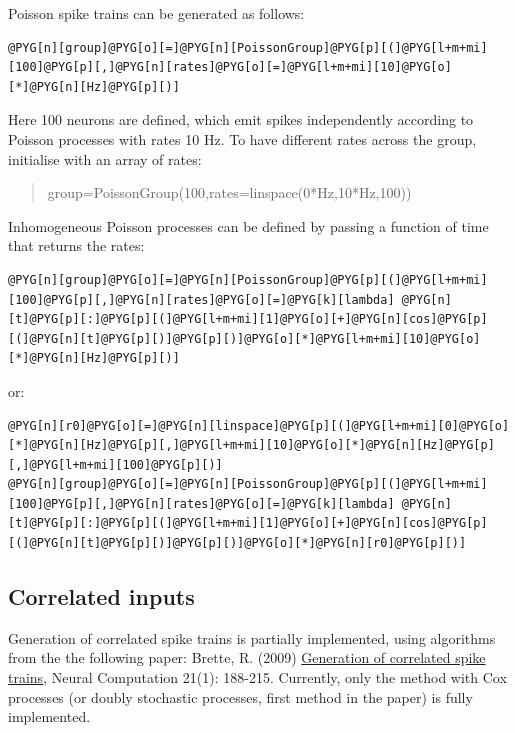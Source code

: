 \documentclass[letterpaper,10pt,english]{manual}
\begin{document}
Poisson spike trains can be generated as follows:

\begin{Verbatim}[commandchars=@\[\]]
@PYG[n][group]@PYG[o][=]@PYG[n][PoissonGroup]@PYG[p][(]@PYG[l+m+mi][100]@PYG[p][,]@PYG[n][rates]@PYG[o][=]@PYG[l+m+mi][10]@PYG[o][*]@PYG[n][Hz]@PYG[p][)]
\end{Verbatim}

Here 100 neurons are defined, which emit spikes independently according to Poisson
processes with rates 10 Hz. To have different rates across the group,
initialise with an array of rates:
\begin{quote}

group=PoissonGroup(100,rates=linspace(0*Hz,10*Hz,100))
\end{quote}

Inhomogeneous Poisson processes can be defined by passing a function of time that returns the
rates:

\begin{Verbatim}[commandchars=@\[\]]
@PYG[n][group]@PYG[o][=]@PYG[n][PoissonGroup]@PYG[p][(]@PYG[l+m+mi][100]@PYG[p][,]@PYG[n][rates]@PYG[o][=]@PYG[k][lambda] @PYG[n][t]@PYG[p][:]@PYG[p][(]@PYG[l+m+mi][1]@PYG[o][+]@PYG[n][cos]@PYG[p][(]@PYG[n][t]@PYG[p][)]@PYG[p][)]@PYG[o][*]@PYG[l+m+mi][10]@PYG[o][*]@PYG[n][Hz]@PYG[p][)]
\end{Verbatim}

or:

\begin{Verbatim}[commandchars=@\[\]]
@PYG[n][r0]@PYG[o][=]@PYG[n][linspace]@PYG[p][(]@PYG[l+m+mi][0]@PYG[o][*]@PYG[n][Hz]@PYG[p][,]@PYG[l+m+mi][10]@PYG[o][*]@PYG[n][Hz]@PYG[p][,]@PYG[l+m+mi][100]@PYG[p][)]
@PYG[n][group]@PYG[o][=]@PYG[n][PoissonGroup]@PYG[p][(]@PYG[l+m+mi][100]@PYG[p][,]@PYG[n][rates]@PYG[o][=]@PYG[k][lambda] @PYG[n][t]@PYG[p][:]@PYG[p][(]@PYG[l+m+mi][1]@PYG[o][+]@PYG[n][cos]@PYG[p][(]@PYG[n][t]@PYG[p][)]@PYG[p][)]@PYG[o][*]@PYG[n][r0]@PYG[p][)]
\end{Verbatim}


\subsection{Correlated inputs}

Generation of correlated spike trains is partially implemented, using algorithms from the
the following paper: Brette, R. (2009) \href{http://www.di.ens.fr/~brette/papers/Brette2008NC.html}{Generation of correlated spike trains},
Neural Computation 21(1): 188-215. Currently, only the method with Cox processes
(or doubly stochastic processes, first method in the paper) is fully implemented.
\end{document}
